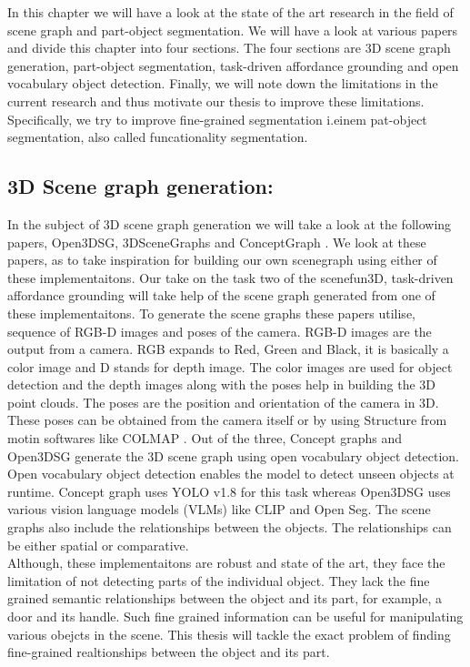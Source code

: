 In this chapter we will have a look at the 
state of the art research in the field of scene
 graph and part-object segmentation. We will have a look 
 at various papers and divide this chapter into four sections.
 The four sections are 3D scene graph generation, part-object segmentation,
 task-driven affordance grounding and open vocabulary object detection.
 Finally, we will note down the limitations in the current
 research and thus motivate our thesis to improve these limitations. 
 Specifically, we try to improve fine-grained segmentation i.einem
 pat-object segmentation, also called funcationality segmentation.
 \subsection{3D Scene graph generation:}
In the subject of 3D scene graph generation we will take a look at the following papers, 
Open3DSG\cite{koch2024open3dsgopenvocabulary3dscene}, 3DSceneGraphs \cite{armeni20193d} and ConceptGraph \cite{gu2023conceptgraphsopenvocabulary3dscene}. 
We look at these papers, as to take inspiration for building our own scenegraph 
using either of these implementaitons. Our take on the task two of the scenefun3D, task-driven affordance grounding will 
take help of the scene graph generated from one of these implementaitons.
To generate the scene graphs these papers utilise,
sequence of RGB-D images and poses of the camera. RGB-D images are the output from a camera.
RGB expands to Red, Green and Black, it is basically a color image and D stands for depth image. The color images
are used for object detection and the depth images along with the poses help in building the 3D point clouds. The poses are
the position and orientation of the camera in 3D. These poses can be obtained from the camera itself or by using Structure from motin softwares like
COLMAP \cite{schoenberger2016mvs} \cite{schoenberger2016sfm}. Out of the three, Concept graphs and 
Open3DSG generate the 3D scene graph using open vocabulary object detection. Open vocabulary
object detection enables the model to detect unseen objects at runtime. Concept graph uses YOLO v1.8 for this task whereas Open3DSG uses 
various vision language models (VLMs) like CLIP and Open Seg.
 The scene graphs also include the relationships between the 
objects. The relationships can be either spatial or comparative. \\
Although, these implementaitons are robust and state of the art, they face the limitation of not detecting
parts of the individual object. They lack the fine grained semantic relationships between the object and its part, for example, a door and its handle.
Such fine grained information can be useful for manipulating various obejcts in the scene. This  thesis will tackle the exact problem of 
finding fine-grained realtionships between the object and its part.

